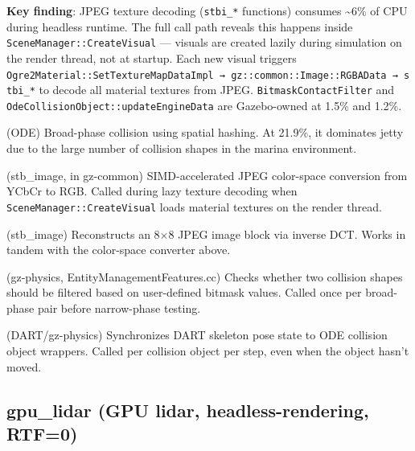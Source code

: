 \documentclass[11pt, a4paper]{article}
\begin{document}
\textbf{Key finding}: JPEG texture decoding (\texttt{stbi\_*} functions)
consumes \textasciitilde6\% of CPU during headless runtime. The full
call path reveals this happens inside
\texttt{SceneManager::CreateVisual} --- visuals are created lazily
during simulation on the render thread, not at startup. Each new visual
triggers
\texttt{Ogre2Material::SetTextureMapDataImpl\ →\ gz::common::Image::RGBAData\ →\ stbi\_*}
to decode all material textures from JPEG. \texttt{BitmaskContactFilter}
and \texttt{OdeCollisionObject::updateEngineData} are Gazebo-owned at
1.5\% and 1.2\%.

\begin{description}[style=nextline, leftmargin=1.5cm]
\item[\texttt{dxHashSpace::collide}] (ODE) Broad-phase collision using spatial hashing. At 21.9\%, it dominates jetty due to the large number of collision shapes in the marina environment.
\item[\texttt{stbi\_\_YCbCr\_to\_RGB\_simd}] (stb\_image, in gz-common) SIMD-accelerated JPEG color-space conversion from YCbCr to RGB. Called during lazy texture decoding when \texttt{SceneManager::CreateVisual} loads material textures on the render thread.
\item[\texttt{stbi\_\_jpeg\_decode\_block}] (stb\_image) Reconstructs an 8$\times$8 JPEG image block via inverse DCT. Works in tandem with the color-space converter above.
\item[\texttt{BitmaskContactFilter::ignoresCollision}] (gz-physics, EntityManagementFeatures.cc) Checks whether two collision shapes should be filtered based on user-defined bitmask values. Called once per broad-phase pair before narrow-phase testing.
\item[\texttt{OdeCollisionObject::updateEngineData}] (DART/gz-physics) Synchronizes DART skeleton pose state to ODE collision object wrappers. Called per collision object per step, even when the object hasn't moved.
\end{description}

\hypertarget{gpu_lidar-gpu-lidar-headless-rendering-rtf0}{%
\subsection{gpu\_lidar (GPU lidar, headless-rendering,
RTF=0)}\label{gpu_lidar-gpu-lidar-headless-rendering-rtf0}}
\end{document}
